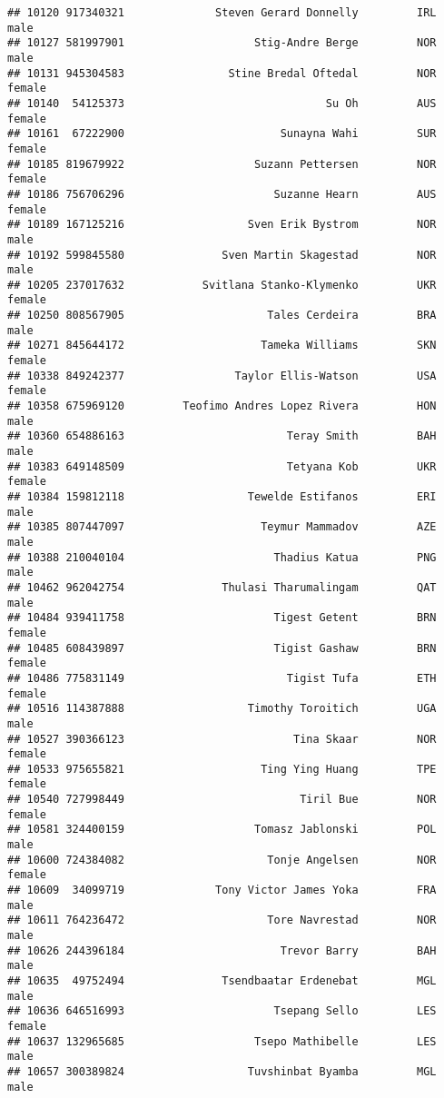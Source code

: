 \documentclass[]{article}
\begin{document}
\begin{verbatim}
## 10120 917340321              Steven Gerard Donnelly         IRL   male
## 10127 581997901                    Stig-Andre Berge         NOR   male
## 10131 945304583                Stine Bredal Oftedal         NOR female
## 10140  54125373                               Su Oh         AUS female
## 10161  67222900                        Sunayna Wahi         SUR female
## 10185 819679922                    Suzann Pettersen         NOR female
## 10186 756706296                       Suzanne Hearn         AUS female
## 10189 167125216                   Sven Erik Bystrom         NOR   male
## 10192 599845580               Sven Martin Skagestad         NOR   male
## 10205 237017632            Svitlana Stanko-Klymenko         UKR female
## 10250 808567905                      Tales Cerdeira         BRA   male
## 10271 845644172                     Tameka Williams         SKN female
## 10338 849242377                 Taylor Ellis-Watson         USA female
## 10358 675969120         Teofimo Andres Lopez Rivera         HON   male
## 10360 654886163                         Teray Smith         BAH   male
## 10383 649148509                         Tetyana Kob         UKR female
## 10384 159812118                   Tewelde Estifanos         ERI   male
## 10385 807447097                     Teymur Mammadov         AZE   male
## 10388 210040104                       Thadius Katua         PNG   male
## 10462 962042754               Thulasi Tharumalingam         QAT   male
## 10484 939411758                       Tigest Getent         BRN female
## 10485 608439897                       Tigist Gashaw         BRN female
## 10486 775831149                         Tigist Tufa         ETH female
## 10516 114387888                   Timothy Toroitich         UGA   male
## 10527 390366123                          Tina Skaar         NOR female
## 10533 975655821                     Ting Ying Huang         TPE female
## 10540 727998449                           Tiril Bue         NOR female
## 10581 324400159                    Tomasz Jablonski         POL   male
## 10600 724384082                      Tonje Angelsen         NOR female
## 10609  34099719              Tony Victor James Yoka         FRA   male
## 10611 764236472                      Tore Navrestad         NOR   male
## 10626 244396184                        Trevor Barry         BAH   male
## 10635  49752494               Tsendbaatar Erdenebat         MGL   male
## 10636 646516993                       Tsepang Sello         LES female
## 10637 132965685                    Tsepo Mathibelle         LES   male
## 10657 300389824                   Tuvshinbat Byamba         MGL   male

\end{verbatim}
\end{document}
